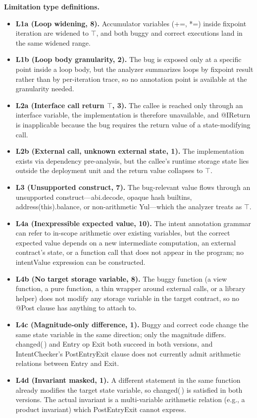 \documentclass[pdflatex,sn-basic]{sn-jnl}%
\theoremstyle{thmstyleone}%
\theoremstyle{thmstyletwo}%
\theoremstyle{thmstylethree}%
\begin{document}
\smallskip
\noindent\textbf{Limitation type definitions.}
\begin{itemize}
  \item \textbf{L1a (Loop widening, 8).} Accumulator variables (+=, *=) inside fixpoint iteration are widened to $\top$, and both buggy and correct executions land in the same widened range.
  \item \textbf{L1b (Loop body granularity, 2).} The bug is exposed only at a specific point inside a loop body, but the analyzer summarizes loops by fixpoint result rather than by per-iteration trace, so no annotation point is available at the granularity needed.
  \item \textbf{L2a (Interface call return $\top$, 3).} The callee is reached only through an interface variable, the implementation is therefore unavailable, and @IReturn is inapplicable because the bug requires the return value of a state-modifying call.
  \item \textbf{L2b (External call, unknown external state, 1).} The implementation exists via dependency pre-analysis, but the callee's runtime storage state lies outside the deployment unit and the return value collapses to $\top$.
  \item \textbf{L3 (Unsupported construct, 7).} The bug-relevant value flows through an unsupported construct---abi.decode, opaque hash builtins, address(this).balance, or non-arithmetic Yul---which the analyzer treats as $\top$.
  \item \textbf{L4a (Inexpressible expected value, 10).} The intent annotation grammar can refer to in-scope arithmetic over existing variables, but the correct expected value depends on a new intermediate computation, an external contract's state, or a function call that does not appear in the program; no intentValue expression can be constructed.
  \item \textbf{L4b (No target storage variable, 8).} The buggy function (a view function, a pure function, a thin wrapper around external calls, or a library helper) does not modify any storage variable in the target contract, so no @Post clause has anything to attach to.
  \item \textbf{L4c (Magnitude-only difference, 1).} Buggy and correct code change the same state variable in the same direction; only the magnitude differs. changed(\,) and Entry op Exit both succeed in both versions, and IntentChecker's PostEntryExit clause does not currently admit arithmetic relations between Entry and Exit.
  \item \textbf{L4d (Invariant masked, 1).} A different statement in the same function already modifies the target state variable, so changed(\,) is satisfied in both versions. The actual invariant is a multi-variable arithmetic relation (e.g., a product invariant) which PostEntryExit cannot express.

\end{itemize}
\end{document}

